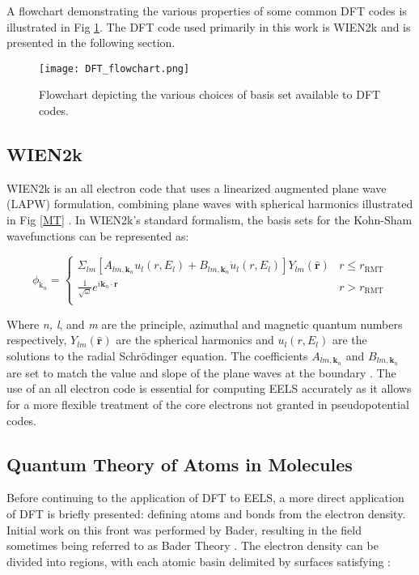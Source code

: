  A flowchart demonstrating the various properties of some common DFT codes is illustrated in Fig \ref{dft-flowchart}.  The DFT code used primarily in this work is WIEN2k and is presented in the following section.

\begin{figure}
	\centering
	\texttt{[image: DFT\_flowchart.png]}
	\caption{Flowchart depicting the various choices of basis set available to DFT codes.}
	\label{dft-flowchart}
\end{figure}


\subsection{WIEN2k}
WIEN2k is an all electron code that uses a linearized augmented plane wave (LAPW) formulation, combining plane waves with spherical harmonics illustrated in Fig \ref{MT} \cite{wien2k}.   In WIEN2k's standard formalism, the basis sets for the Kohn-Sham wavefunctions can be represented as: 

\begin{equation}
	\phi_{\mathrm{k}_n} = 
	\begin{cases}
	\Sigma_{lm} [A_{lm,\textbf{k}_n}u_l(r,E_l) + B_{lm,\textbf{k}_n}\dot{u}_l(r,E_l)]Y_{lm}(\hat{\textbf{r}}) & r \leq r_{\mathrm{RMT}} \\
	\frac{1}{\sqrt{\omega}}e^{i\textbf{k}_n \cdot \textbf{r}} & r> r_{\mathrm{RMT}} \\
	\end{cases}
\end{equation}

Where \textit{n, l}, and \textit{m} are the principle, azimuthal and magnetic quantum numbers respectively, $Y_{lm}(\hat{\textbf{r}})$ are the spherical harmonics and $u_l(r,E_l)$ are the solutions to the radial Schr\"odinger equation.  The coefficients $A_{lm,\textbf{k}_n}$ and $B_{lm,\textbf{k}_n}$ are set to match the value and slope of the plane waves at the boundary \cite{wien2k}.  The use of an all electron code is essential for computing EELS accurately as it allows for a more flexible treatment of the core electrons not granted in pseudopotential codes. 
 


\subsection{Quantum Theory of Atoms in Molecules} \label{bader-theory}
Before continuing to the application of DFT to EELS,  a more direct application of DFT is briefly presented: defining atoms and bonds from the electron density. Initial work on this front was performed by Bader, resulting in the field sometimes being referred to as Bader Theory \cite{bader}. The electron density can be divided into regions, with each atomic basin  delimited by surfaces satisfying \cite{bader_quantum_1991}: 


